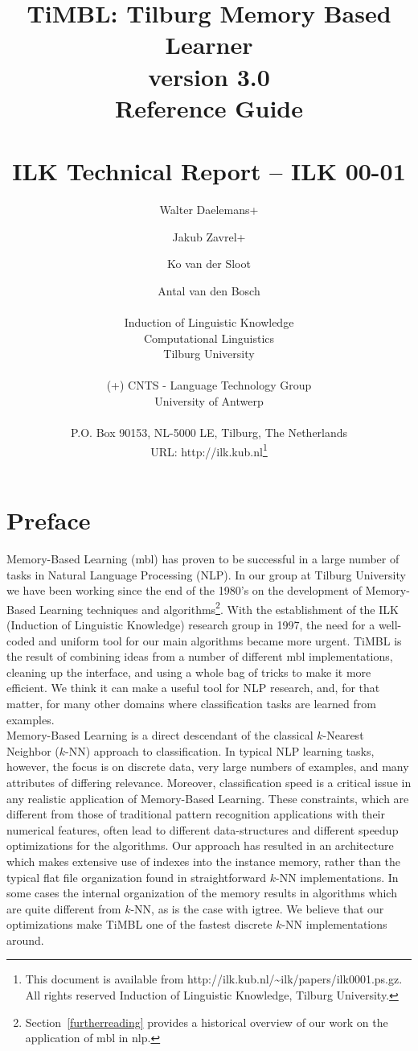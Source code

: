 \documentclass{report}
\author{Walter Daelemans+ \and Jakub Zavrel+ \and Ko van der Sloot \and
	Antal van den Bosch\\ \ \\
	Induction of Linguistic Knowledge\\
	Computational Linguistics\\ 
        Tilburg University \\ \\
	(+) CNTS - Language Technology Group\\
	University of Antwerp\\ \\
        P.O. Box 90153, NL-5000 LE, Tilburg, The Netherlands \\ 
        URL: http://ilk.kub.nl\thanks{This document is available from
	http://ilk.kub.nl/\~{}ilk/papers/ilk0001.ps.gz. All rights reserved
	Induction of Linguistic Knowledge, Tilburg University.}}
\title{{\huge TiMBL: Tilburg Memory Based Learner}\\version
3.0\\{\huge Reference Guide}\\ \ \\ILK Technical Report -- ILK 00-01}
\begin{document}

\maketitle

\tableofcontents

\chapter*{Preface}

Memory-Based Learning ({\sc mbl}) has proven to be successful in a
large number of tasks in Natural Language Processing (NLP). In our
group at Tilburg University we have been working since the end of the
1980's on the development of Memory-Based Learning techniques and
algorithms\footnote{Section~\ref{furtherreading} provides a historical
overview of our work on the application of {\sc mbl} in {\sc
nlp}.}. With the establishment of the ILK (Induction of Linguistic
Knowledge) research group in 1997, the need for a well-coded and
uniform tool for our main algorithms became more urgent. TiMBL is the
result of combining ideas from a number of different {\sc mbl}
implementations, cleaning up the interface, and using a whole bag of
tricks to make it more efficient. We think it can make a useful tool
for NLP research, and, for that matter, for many other domains where
classification tasks are learned from examples.\\

Memory-Based Learning is a direct descendant of the classical
$k$-Nearest Neighbor ($k$-NN) approach to classification. In typical
NLP learning tasks, however, the focus is on discrete data, very large
numbers of examples, and many attributes of differing
relevance. Moreover, classification speed is a critical issue in any
realistic application of Memory-Based Learning. These constraints,
which are different from those of traditional pattern
recognition applications with their numerical features, often lead to
different data-structures and different speedup optimizations for the
algorithms. Our approach has resulted in an architecture which makes
extensive use of indexes into the instance memory, rather than the
typical flat file organization found in straightforward $k$-NN
implementations. In some cases the internal organization of the memory
results in algorithms which are quite different from $k$-NN, as is the
case with {\sc igtree}. We believe that our optimizations make TiMBL
one of the fastest discrete $k$-NN implementations around.\\
\end{document}
